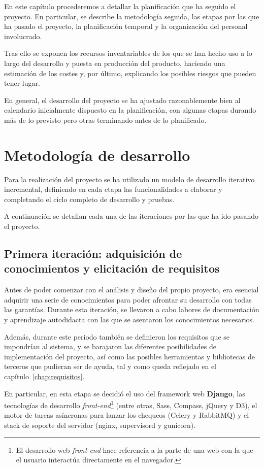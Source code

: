 En este capítulo procederemos a detallar la planificación que ha seguido el
proyecto. En particular, se describe la metodología seguida, las etapas por las
que ha pasado el proyecto, la planificación temporal y la organización del
personal involucrado. 

Tras ello se exponen los recursos inventariables de los
que se han hecho uso a lo largo del desarrollo y puesta en producción del
producto, haciendo una estimación de los costes y, por último, explicando los
posibles riesgos que pueden tener lugar.

En general, el desarrollo del proyecto se ha ajustado razonablemente bien al calendario
inicialmente dispuesto en la planificación, con algunas etapas durando más de lo
previsto pero otras terminando antes de lo planificado. 

\section{Metodología de desarrollo}

Para la realización del proyecto se ha utilizado un modelo de desarrollo
iterativo incremental, definiendo en cada etapa las funcionalidades a
elaborar y completando el ciclo completo de desarrollo y pruebas. 

A continuación se detallan cada una de las iteraciones por las que ha ido
pasando el proyecto.

\subsection{Primera iteración: adquisición de conocimientos y elicitación de requisitos}

Antes de poder comenzar con el análisis y diseño del propio proyecto,
era esencial adquirir una serie de conocimientos para poder afrontar
su desarrollo con todas las garantías. Durante esta iteración, se
llevaron a cabo labores de documentación y aprendizaje autodidacta con
las que se asentaron los conocimientos necesarios.

Además, durante este periodo también se definieron los requisitos que se
impondrían al sistema, y se barajaron las diferentes posibilidades de
implementación del proyecto, así como las posibles herramientas y bibliotecas de
terceros que pudieran ser de ayuda, tal y como queda reflejado en el capítulo~\ref{chap:requisitos}.

En particular, en esta etapa se decidió el uso del framework web
\textbf{Django}, las tecnologías de desarrollo \textit{front-end}\footnote{El
  desarrollo web \textit{front-end} hace referencia a la parte de una web con la
  que el usuario interactúa directamente en el navegador.} (entre otras, Sass,
Compass, jQuery y D3), el motor de tareas asíncronas para lanzar los chequeos
(Celery y RabbitMQ) y el stack de soporte del servidor (nginx, supervisord y
gunicorn).

